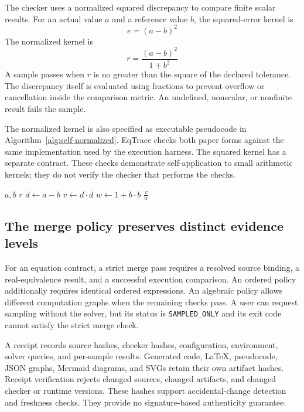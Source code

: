 The checker uses a normalized squared discrepancy to compare finite scalar results. For an actual value $a$ and a reference value $b$, the squared-error kernel is
\begin{equation}
\label{eq:self-square}
 e = (a-b)^2
\end{equation}
The normalized kernel is
\begin{equation}
\label{eq:self-normalized}
 r = \frac{(a-b)^2}{1+b^2}
\end{equation}
A sample passes when $r$ is no greater than the square of the declared tolerance. The discrepancy itself is evaluated using fractions to prevent overflow or cancellation inside the comparison metric. An undefined, nonscalar, or nonfinite result fails the sample.

The normalized kernel is also specified as executable pseudocode in Algorithm~\ref{alg:self-normalized}. EqTrace checks both paper forms against the same implementation used by the execution harness. The squared kernel has a separate contract. These checks demonstrate self-application to small arithmetic kernels; they do not verify the checker that performs the checks.

\begin{algorithm}[t]
\caption{Normalized squared discrepancy}
\label{alg:self-normalized}
\begin{algorithmic}
\Require $a, b$
\Ensure $r$
\State $d \gets a-b$
\State $v \gets d \cdot d$
\State $w \gets 1+b \cdot b$
\State \Return $\frac{v}{w}$
\end{algorithmic}
\end{algorithm}

\subsection{The merge policy preserves distinct evidence levels}
For an equation contract, a strict merge pass requires a resolved source binding, a real-equivalence result, and a successful execution comparison. An ordered policy additionally requires identical ordered expressions. An algebraic policy allows different computation graphs when the remaining checks pass. A user can request sampling without the solver, but its status is \texttt{SAMPLED\_ONLY} and its exit code cannot satisfy the strict merge check.

A receipt records source hashes, checker hashes, configuration, environment, solver queries, and per-sample results. Generated code, LaTeX, pseudocode, JSON graphs, Mermaid diagrams, and SVGs retain their own artifact hashes. Receipt verification rejects changed sources, changed artifacts, and changed checker or runtime versions. These hashes support accidental-change detection and freshness checks. They provide no signature-based authenticity guarantee.

